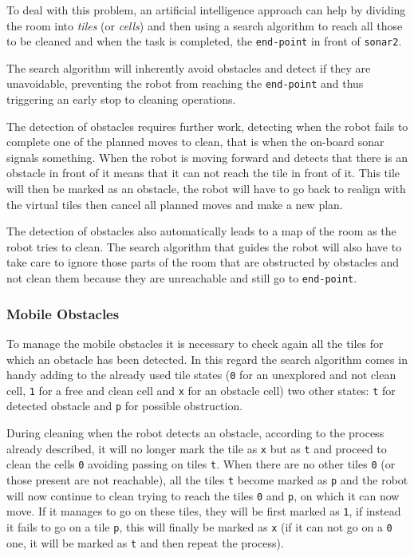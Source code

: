 To deal with this problem, an artificial intelligence approach can help by dividing the room into \textit{tiles} (or \textit{cells}) and then using a search algorithm to reach all those to be cleaned and when the task is completed, the \texttt{end-point} in front of \texttt{sonar2}.

The search algorithm will inherently avoid obstacles and detect if they are unavoidable, preventing the robot from reaching the \texttt{end-point} and thus triggering an early stop to cleaning operations.

The detection of obstacles requires further work, detecting when the robot fails to complete one of the planned moves to clean, that is when the on-board sonar signals something. When the robot is moving forward and detects that there is an obstacle in front of it means that it can not reach the tile in front of it. This tile will then be marked as an obstacle, the robot will have to go back to realign with the virtual tiles then cancel all planned moves and make a new plan.

The detection of obstacles also automatically leads to a map of the room as the robot tries to clean. The search algorithm that guides the robot will also have to take care to ignore those parts of the room that are obstructed by obstacles and not clean them because they are unreachable and still go to \texttt{end-point}.

\subsubsection{Mobile Obstacles}
To manage the mobile obstacles it is necessary to check again all the tiles for which an obstacle has been detected. In this regard the search algorithm comes in handy adding to the already used tile states (\texttt{0} for an unexplored and not clean cell, \texttt{1} for a free and clean cell and \texttt{x} for an obstacle cell) two other states: \texttt{t} for detected obstacle and \texttt{p} for possible obstruction.

During cleaning when the robot detects an obstacle, according to the process already described, it will no longer mark the tile as \texttt{x} but as \texttt{t} and proceed to clean the cells \texttt{0} avoiding passing on tiles \texttt{t}. When there are no other tiles \texttt{0} (or those present are not reachable), all the tiles \texttt{t} become marked as \texttt{p} and the robot will now continue to clean trying to reach the tiles \texttt{0} and \texttt{p}, on which it can now move. If it manages to go on these tiles, they will be first marked as \texttt{1}, if instead it fails to go on a tile \texttt{p}, this will finally be marked as \texttt{x} (if it can not go on a \texttt{0} one, it will be marked as \texttt{t} and then repeat the process).

